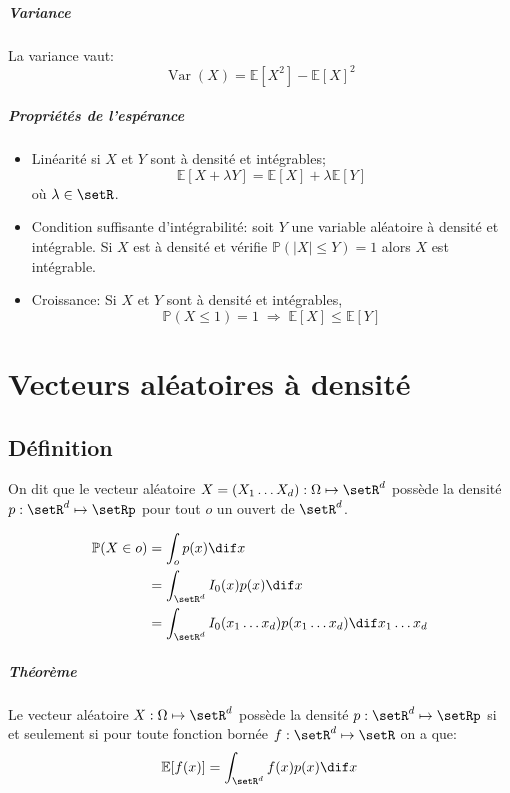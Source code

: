 \documentclass[a4paper,10pt,french,openany]{memoir}
\newcommand{\Proba}{\mathbb{P}}
\newcommand{\Esper}{\mathbb{E}}
\newcommand{\implique}{\Rightarrow}
\newcommand{\abs}[1]{\lvert #1 \rvert}
\newcommand{\xoned}{x_1\dots x_d}
\newcommand{\Xoned}{X_1\dots X_d}
\DeclareMathOperator{\Var}{Var}
\begin{document}
\paragraph{Variance}
La variance vaut: \[\Var(X)=\Esper[X^2]-\Esper[X]^2\]

\paragraph{Propriétés de l'espérance}
\begin{itemize}
 \item Linéarité si $X$ et $Y$ sont à densité et intégrables; \[\Esper[X+\lambda Y] = \Esper[X] + \lambda \Esper[Y]\]
 où $\lambda \in \setR$.
 
 \item Condition suffisante d'intégrabilité: soit $Y$ une variable aléatoire à densité et intégrable. Si $X$ est à densité et vérifie $\Proba(\abs{X}\leq Y)=1$ alors $X$ est intégrable.
 
 \item Croissance: Si $X$ et $Y$ sont à densité et intégrables, \[\Proba(X\leq1) = 1 \;\implique\; \Esper[X] \leq \Esper[Y]\]
\end{itemize}

\chapter{Vecteurs aléatoires à densité}

\section{Définition}

On dit que le vecteur aléatoire $X = (\Xoned): \Omega \mapsto \setR^d$ possède la densité $p: \setR^d \mapsto \setRp$ pour tout $o$ un ouvert de $\setR^d$.

\begin{align*}
 \Proba(X\in o) &= \int_o p(x) \dif x \\
 &= \int_{\setR^d} I_0(x) p(x) \dif x \\
 &= \int_{\setR^d} I_0(\xoned) p(\xoned) \dif \xoned
\end{align*}

\paragraph{Théorème}
Le vecteur aléatoire $X:\Omega \mapsto \setR^d$ possède la densité $p:\setR^d \mapsto \setRp$ si et seulement si pour toute fonction bornée $f:\setR^d \mapsto \setR$ on a que: \[\Esper[f(x)]=\int_{\setR^d}f(x)p(x) \dif x\]
\end{document}
